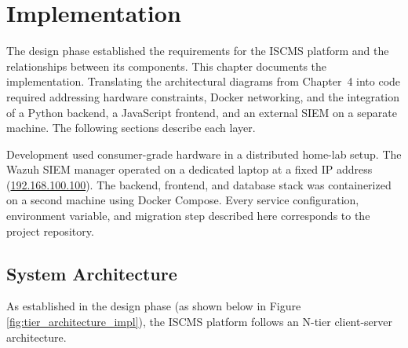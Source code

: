 \chapter{Implementation}

The design phase established the requirements for the ISCMS platform and the relationships between its components. This chapter documents the implementation. Translating the architectural diagrams from Chapter~4 into code required addressing hardware constraints, Docker networking, and the integration of a Python backend, a JavaScript frontend, and an external SIEM on a separate machine. The following sections describe each layer.

Development used consumer-grade hardware in a distributed home-lab setup. The Wazuh SIEM manager operated on a dedicated laptop at a fixed IP address (\url{192.168.100.100}). The backend, frontend, and database stack was containerized on a second machine using Docker Compose. Every service configuration, environment variable, and migration step described here corresponds to the project repository.

\section{System Architecture}

As established in the design phase (as shown below in Figure \ref{fig:tier_architecture_impl}), the ISCMS platform follows an N-tier client-server architecture.

